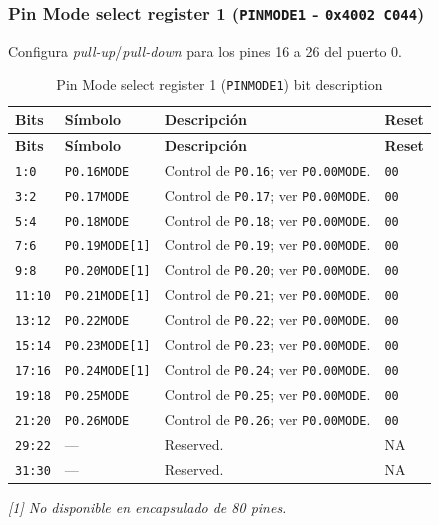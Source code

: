\subsubsection{Pin Mode select register 1 (\texttt{PINMODE1} - \texttt{0x4002 C044})}
Configura \textit{pull-up}/\textit{pull-down} para los pines 16 a 26 del puerto 0.

\begin{longtable}{|>{\raggedright\arraybackslash}p{}|>{\raggedright\arraybackslash}p{}|>{\raggedright\arraybackslash}p{}|>{\centering\arraybackslash}p{}|}
\caption{Pin Mode select register 1 (\texttt{PINMODE1}) bit description}\\
\hline
\textbf{Bits} & \textbf{Símbolo} & \textbf{Descripción} & \textbf{Reset} \\
\hline
\endfirsthead
\hline
\textbf{Bits} & \textbf{Símbolo} & \textbf{Descripción} & \textbf{Reset} \\
\hline
\endhead
\texttt{1:0} & \texttt{P0.16MODE} & Control de \texttt{P0.16}; ver \texttt{P0.00MODE}. & \texttt{00} \\
\hline
\texttt{3:2} & \texttt{P0.17MODE} & Control de \texttt{P0.17}; ver \texttt{P0.00MODE}. & \texttt{00} \\
\hline
\texttt{5:4} & \texttt{P0.18MODE} & Control de \texttt{P0.18}; ver \texttt{P0.00MODE}. & \texttt{00} \\
\hline
\texttt{7:6} & \texttt{P0.19MODE[1]} & Control de \texttt{P0.19}; ver \texttt{P0.00MODE}. & \texttt{00} \\
\hline
\texttt{9:8} & \texttt{P0.20MODE[1]} & Control de \texttt{P0.20}; ver \texttt{P0.00MODE}. & \texttt{00} \\
\hline
\texttt{11:10} & \texttt{P0.21MODE[1]} & Control de \texttt{P0.21}; ver \texttt{P0.00MODE}. & \texttt{00} \\
\hline
\texttt{13:12} & \texttt{P0.22MODE} & Control de \texttt{P0.22}; ver \texttt{P0.00MODE}. & \texttt{00} \\
\hline
\texttt{15:14} & \texttt{P0.23MODE[1]} & Control de \texttt{P0.23}; ver \texttt{P0.00MODE}. & \texttt{00} \\
\hline
\texttt{17:16} & \texttt{P0.24MODE[1]} & Control de \texttt{P0.24}; ver \texttt{P0.00MODE}. & \texttt{00} \\
\hline
\texttt{19:18} & \texttt{P0.25MODE} & Control de \texttt{P0.25}; ver \texttt{P0.00MODE}. & \texttt{00} \\
\hline
\texttt{21:20} & \texttt{P0.26MODE} & Control de \texttt{P0.26}; ver \texttt{P0.00MODE}. & \texttt{00} \\
\hline
\texttt{29:22} & --- & Reserved. & NA \\
\hline
\texttt{31:30} & --- & Reserved. & NA \\
\hline
\end{longtable}
\noindent\textit{[1] No disponible en encapsulado de 80 pines.}

